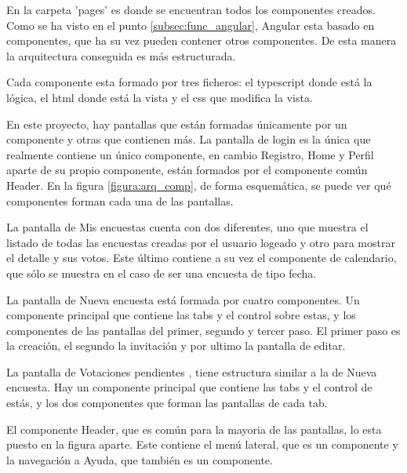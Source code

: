 \documentclass[a4paper, 12pt]{book}
\begin{document}
En la carpeta 'pages' es donde se encuentran todos los componentes creados. Como se ha visto en el punto \ref{subsec:func_angular}, Angular esta basado en componentes, que ha su vez
pueden contener otros componentes. De esta manera la arquitectura conseguida es m\'as estructurada. 

Cada componente esta formado por tres ficheros: el typescript donde est\'a la l\'ogica, el html donde est\'a la vista y el css que modifica la vista.

En este proyecto, hay pantallas que est\'an formadas \'unicamente por un componente y otras que contienen m\'as. La pantalla de login es la \'unica que realmente contiene un \'unico componente, en cambio Registro, Home y Perfil aparte de su propio componente, est\'an formados por el componente com\'un Header. En la figura \ref{figura:arq_comp}, de forma esquem\'atica, se puede ver qu\'e componentes forman cada una de las pantallas. 

La pantalla de Mis encuestas cuenta con dos diferentes, uno que muestra el listado de todas las encuestas creadas por el usuario logeado  y otro para mostrar el detalle y sus votos. Este \'ultimo contiene a su vez el componente de calendario, que s\'olo se muestra en el caso de ser una encuesta de tipo fecha.

La pantalla de Nueva encuesta est\'a formada por cuatro componentes. Un componente principal que contiene las tabs y el control sobre estas, y los componentes de las pantallas del primer, segundo y tercer paso. El primer paso es la creaci\'on, el segundo la invitaci\'on y por ultimo la pantalla de editar.

La pantalla de Votaciones pendientes , tiene estructura similar a la de Nueva encuesta. Hay un componente principal que contiene las tabs y el control de est\'as, y los dos componentes que forman las pantallas de cada tab.

El componente Header, que es com\'un para la mayoria de las pantallas, lo esta puesto en la figura aparte. Este contiene el men\'u lateral, que es un componente y la navegaci\'on a Ayuda, que tambi\'en es un componente.
\end{document}

